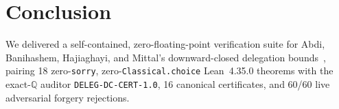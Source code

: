 \documentclass[10pt,twocolumn]{article}
\newcommand{\QQ}{\mathbb{Q}}
\begin{document}
\section{Conclusion}\label{sec:conc}
We delivered a self-contained, zero-floating-point verification suite for Abdi, Banihashem, Hajiaghayi, and Mittal's downward-closed delegation bounds~\cite{abdi2026delegation}, pairing 18 zero-\texttt{sorry}, zero-\texttt{Classical.choice} Lean~4.35.0 theorems with the exact-$\QQ$ auditor \texttt{DELEG-DC-CERT-1.0}, 16 canonical certificates, and 60/60 live adversarial forgery rejections.



\end{document}

